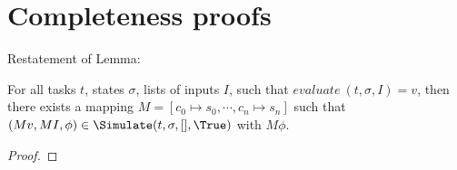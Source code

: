 
\section{Completeness proofs}
\label{sec:completenessproofs}

Restatement of Lemma:\\

\begin{lemma}

  For all tasks $t$, states $\sigma$, lists of inputs $I$,
  such that $evaluate\ (t,\sigma,I)=v$,
  then there exists a mapping $M = [c_0\mapsto s_0,\cdots,c_n\mapsto s_n]$
  such that $(M v,M I,\phi)\in\Simulate(t,\sigma,[],\True)$ with $M \phi$.
\end{lemma}

\begin{proof}

\end{proof}

